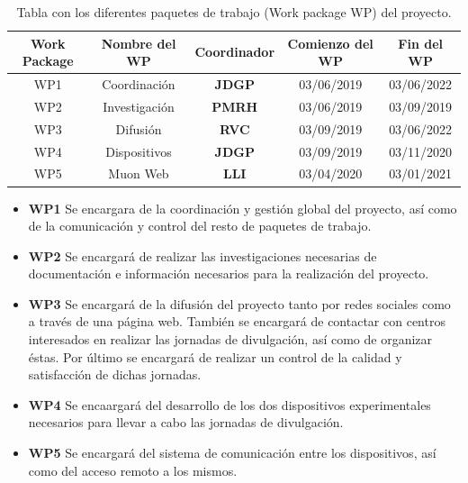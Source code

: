 \documentclass[11pt]{extarticle}
\begin{document}
						\begin{table}[H]
							\centering
							\begin{tabular}{ c c c c c }
								\hline
								\centering
									Work Package 	& Nombre del WP 	& Coordinador 	& Comienzo del WP 	& Fin del WP \\ \hline
									\hline
									WP1 			& Coordinación 		& \textbf{JDGP} & 03/06/2019 		& 03/06/2022 \\ \hline
									WP2 			& Investigación 	& \textbf{PMRH} & 03/06/2019 		& 03/09/2019 \\ \hline
									WP3 			& Difusión 			& \textbf{RVC} 	& 03/09/2019 		& 03/06/2022 \\ \hline
									WP4 			& Dispositivos 		& \textbf{JDGP} & 03/09/2019 		& 03/11/2020 \\ \hline
									WP5 			& Muon Web 			& \textbf{LLI} 	& 03/04/2020 		& 03/01/2021 \\ \hline
							\end{tabular}
							\caption{\label{Tab:allWP}Tabla con los diferentes paquetes de trabajo (Work package WP) del proyecto.}
						\end{table}

					\begin{itemize}
						\item \textbf{WP1} Se encargara de la coordinación y gestión global del proyecto, así como de la comunicación y control del resto de paquetes de trabajo.

						\item \textbf{WP2} Se encargará de realizar las investigaciones necesarias de documentación e información necesarios para la realización del proyecto.

						\item \textbf{WP3} Se encargará de la difusión del proyecto tanto por redes sociales como a través de una página web. También se encargará de contactar con centros interesados en realizar las jornadas de divulgación, así como de organizar éstas. Por último se encargará de realizar un control de la calidad y satisfacción de dichas jornadas.

						\item \textbf{WP4} Se encaargará del desarrollo de los dos dispositivos experimentales necesarios para llevar a cabo las jornadas de divulgación.

						\item \textbf{WP5} Se encargará del sistema de comunicación entre los dispositivos, así como del acceso remoto a los mismos.
					\end{itemize}
\end{document}
